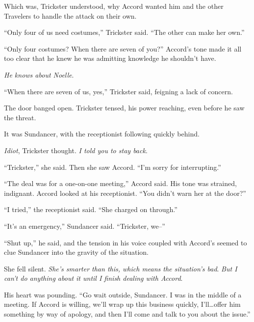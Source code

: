 Which was, Trickster understood, why Accord wanted him and the other Travelers to handle the attack on their own.



``Only four of us need costumes,'' Trickster said.  ``The other can make her own.''



``Only four costumes?  When there are seven of you?''  Accord's tone made it all too clear that he knew he was admitting knowledge he shouldn't have.



\emph{He knows about Noelle}.



``When there are seven of us, yes,'' Trickster said, feigning a lack of concern.



The door banged open.  Trickster tensed, his power reaching, even before he saw the threat.



It was Sundancer, with the receptionist following quickly behind.



\emph{Idiot}, Trickster thought.  \emph{I told you to stay back}.



``Trickster,'' she said.  Then she saw Accord.  ``I'm sorry for interrupting.''



``The deal was for a one-on-one meeting,'' Accord said.  His tone was strained, indignant.  Accord looked at his receptionist. ``You didn't warn her at the door?''



``I tried,'' the receptionist said.  ``She charged on through.''



``It's an emergency,'' Sundancer said.  ``Trickster, we--''



``Shut up,'' he said, and the tension in his voice coupled with Accord's seemed to clue Sundancer into the gravity of the situation.



She fell silent.  \emph{She's smarter than this, which means the situation's bad}.  \emph{But I can't do anything about it until I finish dealing with Accord}.



His heart was pounding.  ``Go wait outside, Sundancer.  I was in the middle of a meeting.  If Accord is willing, we'll wrap up this business quickly, I'll\ldots offer him something by way of apology, and then I'll come and talk to you about the issue.''



